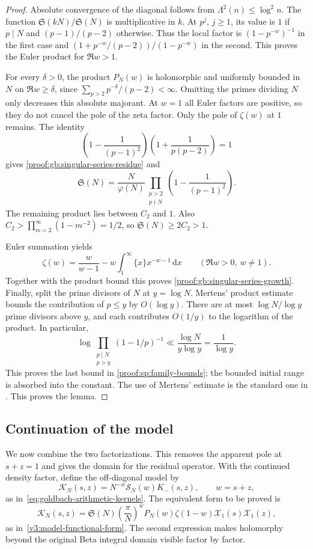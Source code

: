 \documentclass[12pt,a4paper]{amsart}
\numberwithin{equation}{section}
\def\le{\leqslant}
\def\ge{\geqslant}
\theoremstyle{plain}
\theoremstyle{definition}
\theoremstyle{remark}
\begin{document}
\begin{proof}
Absolute convergence of the diagonal follows from
$\Lambda^2(n)\le\log^2n$. The function
$\mathfrak S(kN)/\mathfrak S(N)$ is multiplicative in $k$.
At $p^j$, $j\ge1$, its value is $1$ if $p\mid N$ and
$(p-1)/(p-2)$ otherwise. Thus the local factor is
$(1-p^{-w})^{-1}$ in the first case and
$(1+p^{-w}/(p-2))/(1-p^{-w})$ in the second. This proves the
Euler product for $\Re w>1$.

For every $\delta>0$, the product $P_N(w)$ is holomorphic and
uniformly bounded in $N$ on $\Re w\ge\delta$, since
$\sum_{p>2}p^{-\delta}/(p-2)<\infty$.
Omitting the primes dividing $N$ only decreases this absolute
majorant. At $w=1$ all Euler factors are positive, so they do not
cancel the pole of the zeta factor.
Only the pole of $\zeta(w)$ at $1$ remains. The identity
\[
 \left(1-\frac1{(p-1)^2}\right)
 \left(1+\frac1{p(p-2)}\right)=1
\]
gives \eqref{proof:gb:singular-series-residue} and
\[
 \mathfrak S(N)=\frac N{\varphi(N)}
 \prod_{\substack{p>2\\p\nmid N}}
             \left(1-\frac1{(p-1)^2}\right).
\]
The remaining product lies between $C_2$ and $1$.
Also $C_2>\prod_{m=2}^\infty(1-m^{-2})=1/2$, so
$\mathfrak S(N)\ge2C_2>1$.

Euler summation yields
\[
 \zeta(w)=\frac w{w-1}
       -w\int_1^\infty\{x\}x^{-w-1}\,\mathrm{d}x
       \qquad(\Re w>0,\ w\ne1).
\]
Together with the product bound this proves
\eqref{proof:gb:singular-series-growth}.
Finally, split the prime divisors of $N$ at $y=\log N$.
Mertens' product estimate bounds the contribution of $p\le y$
by $O(\log y)$. There are at most $\log N/\log y$ prime divisors above $y$,
and each contributes $O(1/y)$ to the logarithm of the product. In particular,
\[
 \log\prod_{\substack{p\mid N\\p>y}}(1-1/p)^{-1}
 \ll\frac{\log N}{y\log y}=\frac1{\log y}.
\]
This proves the last bound in \eqref{proof:sp:family-bounds}; the bounded
initial range is absorbed into the constant. The use of Mertens'
estimate is the standard one in \cite{IK2004}.
This proves the lemma.
\end{proof}

\subsection{Continuation of the model}
\label{proof:v7:model-continuation}

We now combine the two factorizations. This removes the apparent
pole at $s+z=1$ and gives the domain for the residual operator.
With the continued density factor, define the off-diagonal model by
\[
 \mathscr K_N(s,z)=N^{-w}\mathscr S_N(w)K_-(s,z),\qquad w=s+z,
\]
as in~\eqref{eq:goldbach-arithmetic-kernels}.
The equivalent form to be proved is
\[
 \mathscr K_N(s,z)=\mathfrak S(N)\left(\frac\pi N\right)^w
       P_N(w)\zeta(1-w)\mathcal X_1(s)\mathcal X_1(z),
\]
as in~\eqref{v3:model-functional-form}.
The second expression makes holomorphy beyond the original Beta
integral domain visible factor by factor.
\end{document}
